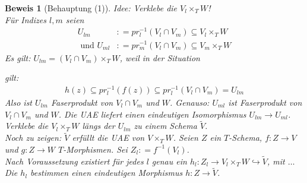 \documentclass[a4paper,oneside]{scrbook}
\theoremstyle{break}
\theoremstyle{nonumberbreak}
\theoremstyle{nonumberplain}
\newtheorem{Bew}{Beweis}
\theoremstyle{break}
\newcommand{\defeqr}[0]{\mathrel{\mathop:}=}
\begin{document}
\begin{Bew}[Behauptung (1)]
  Idee: Verklebe die $V_l\times_T W$! \\
  Für Indizes $l,m$ seien
  \begin{align*}
    U_{lm}&\defeqr pr_l^{-1}(V_l\cap V_m)\subseteq V_l\times_T W \\
    \text{ und } U_{ml}&\defeqr pr_m^{-1}(V_l\cap V_m)\subseteq V_m\times_T W
  \end{align*}
  Es gilt: $U_{lm}=(V_l\cap V_m)\times_T W$, weil in der Situation
  \begin{center}
  \end{center}
  gilt:
  \begin{align*}
    h(z)\subseteq pr_l^{-1}(f(z))\subseteq pr_l^{-1}(V_l\cap V_m)=U_{lm}
  \end{align*}
  Also ist $U_{lm}$ Faserprodukt von $V_l\cap V_m$ und $W$. Genauso: $U_{ml}$ ist Faserprodukt von $V_l\cap V_m$ und $W$.
  Die UAE liefert einen eindeutigen Isomorphismus $U_{lm}\to U_{ml}$. Verklebe die $V_l\times_T W$ längs der $U_{lm}$ zu einem
  Schema $\tilde{V}$. \\ 
  Noch zu zeigen: $\tilde{V}$ erfüllt die UAE von $V\times_T W$.
  Seien $Z$ ein $T$-Schema, $f:Z\to V$ und $g:Z\to W$ $T$-Morphismen. Sei $Z_l\defeqr f^{-1}(V_l)$. \\
  Nach Voraussetzung existiert für jedes $l$ genau ein $h_l:Z_l\to V_l\times_T W\hookrightarrow \tilde{V}$, mit $\dots$ \\
  Die $h_l$ bestimmen einen eindeutigen Morphismus $h:Z\to \tilde{V}$.
\end{Bew}
\end{document}
